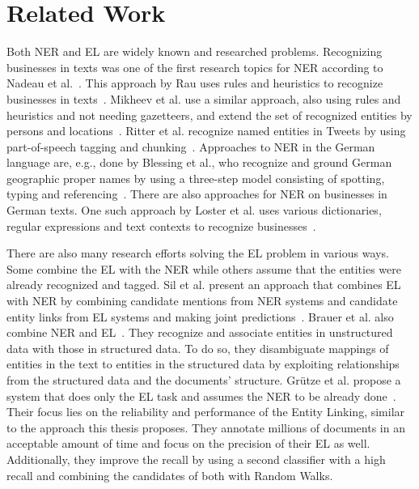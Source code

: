 \section{Related Work}
\label{sec:RelatedWork}
Both NER and EL are widely known and researched problems. Recognizing businesses in texts was one of the first research topics for NER according to Nadeau et al.\ \cite{ner-sekine2007}. This approach by Rau uses rules and heuristics to recognize businesses in texts\ \cite{rau91}. Mikheev et al. use a similar approach, also using rules and heuristics and not needing gazetteers, and extend the set of recognized entities by persons and locations\ \cite{Mikheev:1999:NER:977035.977037}. Ritter et al. recognize named entities in Tweets by using part-of-speech tagging and chunking\ \cite{Ritter:2011:NER:2145432.2145595}. Approaches to NER in the German language are, e.g., done by Blessing et al., who recognize and ground German geographic proper names by using a three-step model consisting of spotting, typing and referencing\ \cite{Blessing:2007:TCM:1316948.1316956}. There are also approaches for NER on businesses in German texts. One such approach by Loster et al. uses various dictionaries, regular expressions and text contexts to recognize businesses\ \cite{Michael2017a}.\par
There are also many research efforts solving the EL problem in various ways. Some combine the EL with the NER while others assume that the entities were already recognized and tagged. Sil et al. present an approach that combines EL with NER by combining candidate mentions from NER systems and candidate entity links from EL systems and making joint predictions\ \cite{Sil:2013:RJN:2505515.2505601}. Brauer et al. also combine NER and EL\ \cite{Brauer:2008:MEE:1458550.1458566}. They recognize and associate entities in unstructured data with those in structured data. To do so, they disambiguate mappings of entities in the text to entities in the structured data by exploiting relationships from the structured data and the documents' structure. Grütze et al. propose a system that does only the EL task and assumes the NER to be already done\ \cite{coheel}. Their focus lies on the reliability and performance of the Entity Linking, similar to the approach this thesis proposes. They annotate millions of documents in an acceptable amount of time and focus on the precision of their EL as well. Additionally, they improve the recall by using a second classifier with a high recall and combining the candidates of both with Random Walks.
